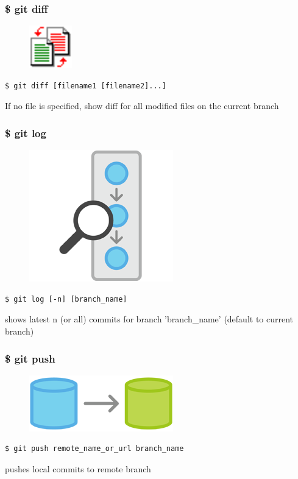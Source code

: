 \documentclass{beamer}
\begin{document}
\begin{frame}[fragile]
    \frametitle{\$ git diff}
    \begin{figure}[h!]
        \begin{center}
            \includegraphics[scale=1.2]{diff.png}
        \end{center}
    \end{figure}
    \begin{verbatim}
$ git diff [filename1 [filename2]...]
    \end{verbatim}
    If no file is specified, show diff for all modified files on the current branch
\end{frame}

\begin{frame}[fragile]
    \frametitle{\$ git log}
    \begin{figure}[h!]
        \begin{center}
            \includegraphics[scale=0.7]{log.png}
        \end{center}
    \end{figure}
    \begin{verbatim}
$ git log [-n] [branch_name]
    \end{verbatim}
    shows latest n (or all) commits for branch 'branch\_name' (default to current branch)
\end{frame}

\begin{frame}[fragile]
    \frametitle{\$ git push}
    \begin{figure}[h!]
        \begin{center}
            \includegraphics[scale=0.7]{push.png}
        \end{center}
    \end{figure}
    \begin{verbatim}
$ git push remote_name_or_url branch_name
    \end{verbatim}
    pushes local commits to remote branch
\end{frame}
\end{document}
